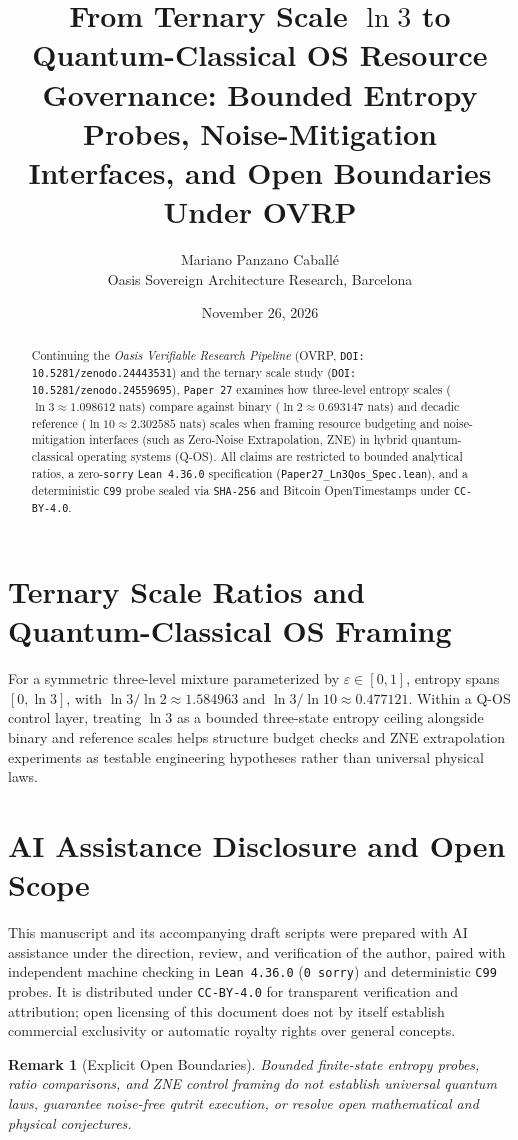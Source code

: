 \documentclass[11pt,a4paper]{article}
\title{From Ternary Scale $\ln 3$ to Quantum-Classical OS Resource Governance: Bounded Entropy Probes, Noise-Mitigation Interfaces, and Open Boundaries Under OVRP}
\author{Mariano Panzano Caball\'e \\ \small Oasis Sovereign Architecture Research, Barcelona}
\date{November 26, 2026}
\newtheorem{remark}{Remark}
\begin{document}
\maketitle

\begin{abstract}
Continuing the \emph{Oasis Verifiable Research Pipeline} (OVRP, \texttt{DOI: 10.5281/zenodo.24443531}) and the ternary scale study (\texttt{DOI: 10.5281/zenodo.24559695}), \texttt{Paper~27} examines how three-level entropy scales ($\ln 3 \approx 1.098612\text{ nats}$) compare against binary ($\ln 2 \approx 0.693147\text{ nats}$) and decadic reference ($\ln 10 \approx 2.302585\text{ nats}$) scales when framing resource budgeting and noise-mitigation interfaces (such as Zero-Noise Extrapolation, ZNE) in hybrid quantum-classical operating systems (Q-OS). All claims are restricted to bounded analytical ratios, a zero-\texttt{sorry} \texttt{Lean~4.36.0} specification (\texttt{Paper27\_Ln3Qos\_Spec.lean}), and a deterministic \texttt{C99} probe sealed via \texttt{SHA-256} and Bitcoin OpenTimestamps under \texttt{CC-BY-4.0}.
\end{abstract}

\section{Ternary Scale Ratios and Quantum-Classical OS Framing}
For a symmetric three-level mixture parameterized by $\varepsilon \in [0, 1]$, entropy spans $[0, \ln 3]$, with $\ln 3 / \ln 2 \approx 1.584963$ and $\ln 3 / \ln 10 \approx 0.477121$. Within a Q-OS control layer, treating $\ln 3$ as a bounded three-state entropy ceiling alongside binary and reference scales helps structure budget checks and ZNE extrapolation experiments as testable engineering hypotheses rather than universal physical laws.

\section*{AI Assistance Disclosure and Open Scope}
This manuscript and its accompanying draft scripts were prepared with AI assistance under the direction, review, and verification of the author, paired with independent machine checking in \texttt{Lean~4.36.0} (\texttt{0~sorry}) and deterministic \texttt{C99} probes. It is distributed under \texttt{CC-BY-4.0} for transparent verification and attribution; open licensing of this document does not by itself establish commercial exclusivity or automatic royalty rights over general concepts.

\begin{remark}[Explicit Open Boundaries]
Bounded finite-state entropy probes, ratio comparisons, and ZNE control framing do not establish universal quantum laws, guarantee noise-free qutrit execution, or resolve open mathematical and physical conjectures.
\end{remark}
\end{document}
